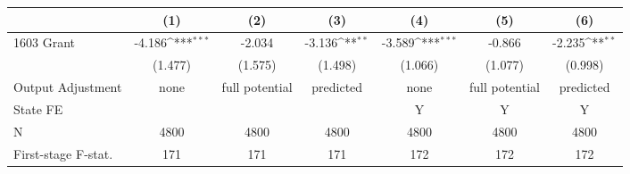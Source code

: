 {
\def\sym#1{\ifmmode^{#1}\else\(^{#1}\)\fi}
\begin{tabular}{l*{6}{c}}
\toprule
                &\multicolumn{1}{c}{(1)}         &\multicolumn{1}{c}{(2)}         &\multicolumn{1}{c}{(3)}         &\multicolumn{1}{c}{(4)}         &\multicolumn{1}{c}{(5)}         &\multicolumn{1}{c}{(6)}         \\
\midrule
1603 Grant      &   -4.186\sym{***}&   -2.034         &   -3.136\sym{**} &   -3.589\sym{***}&   -0.866         &   -2.235\sym{**} \\
                &  (1.477)         &  (1.575)         &  (1.498)         &  (1.066)         &  (1.077)         &  (0.998)         \\
\midrule
Output Adjustment&     none         &full potential         &predicted         &     none         &full potential         &predicted         \\
State FE        &                  &                  &                  &        Y         &        Y         &        Y         \\
N               &     4800         &     4800         &     4800         &     4800         &     4800         &     4800         \\
First-stage F-stat.&      171         &      171         &      171         &      172         &      172         &      172         \\
\bottomrule
\end{tabular}
}
